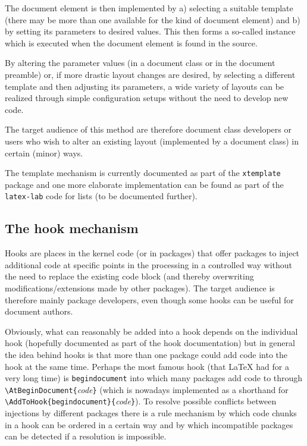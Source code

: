 \documentclass{article}
\newcommand\pkg[1]{\texttt{#1}}
\newcommand\cs[1]{\texttt{\textbackslash #1}}
\newcommand\meta[1]{\textlangle\textit{#1}\textrangle}
\newcommand\marg[1]{\texttt\{\meta{#1}\texttt\}}
\begin{document}
The document element is then implemented by a) selecting a suitable
template (there may be more than one available for the kind of
document element) and b) by setting its parameters to desired
values. This then forms a so-called instance which is executed when
the document element is found in the source.

By altering the parameter values (in a document class or in the
document preamble) or, if more drastic layout changes are desired, by
selecting a different template and then adjusting its parameters, a
wide variety of layouts can be realized through simple configuration
setups without the need to develop new code.

The target audience of this method are therefore document class
developers or users who wish to alter an existing layout (implemented
by a document class) in certain (minor) ways.

The template mechanism is currently documented as part of the
\pkg{xtemplate} package and one more elaborate implementation can be
found as part of the \texttt{latex-lab} code for lists (to be
documented further).

\subsection{The hook mechanism}

Hooks are places in the kernel  code (or in packages) that offer
packages to inject additional code at specific points in the
processing in a controlled way without the need to replace the
existing code block (and thereby overwriting modifications/extensions
made by other packages). The target audience is therefore mainly
package developers, even though some hooks can be useful for document
authors.

Obviously, what can reasonably be added into a hook depends on the
individual hook (hopefully documented as part of the hook
documentation) but in general the idea behind hooks is that more than
one package could add code into the hook at the same time. Perhaps the
most famous hook (that \LaTeX{} had for a very long time) is
\texttt{begindocument} into which many packages add code to through
\cs{AtBeginDocument}\marg{code} (which is nowadays implemented as a
shorthand for \cs{AddToHook}\texttt{\{begindocument\}}\marg{code}). To
resolve possible conflicts between injections by different packages
there is a rule mechanism by which code chunks in a hook can be
ordered in a certain way and by which incompatible packages can be
detected if a resolution is impossible.
\end{document}
